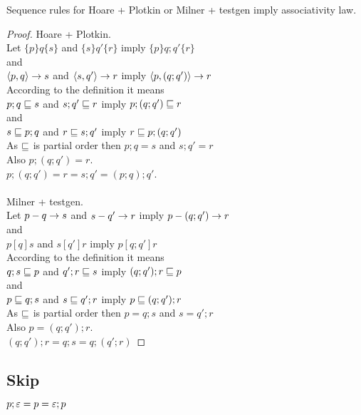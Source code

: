 \documentclass{article}
\begin{document}
\begin{theorem}
Sequence rules for Hoare + Plotkin or Milner + testgen imply associativity law.
\end{theorem}

\begin{proof}
Hoare + Plotkin.\\
Let $\{p\}q\{s\}$ and $\{s\}q'\{r\}$ imply $\{p\}q;q'\{r\}$\\
and\\
$\left< p, q \right> \rightarrow s$ and $\left< s, q' \right> \rightarrow r$ imply $\left< p, (q;q') \right> \rightarrow r$\\
According to the definition it means\\
$p; q \sqsubseteq s$ and $s; q' \sqsubseteq r$ imply $p; (q; q') \sqsubseteq r$\\
and\\
$s \sqsubseteq p; q$ and $r \sqsubseteq s; q'$ imply $r \sqsubseteq p; (q; q')$\\
As $\sqsubseteq$ is partial order then $p; q = s$ and $s; q' = r$\\
Also $p; (q; q') = r$.\\
$p; (q; q') = r = s; q' = (p; q); q'$.\\
\\
Milner + testgen.\\
Let $p-q\rightarrow s$ and $s-q'\rightarrow r$ imply $p-(q;q')\rightarrow r$\\
and\\
$p [q] s$ and $s [q'] r$ imply $p [q; q'] r$\\
According to the definition it means\\
$q; s \sqsubseteq p$ and $q'; r \sqsubseteq s$ imply $(q; q'); r \sqsubseteq p$\\
and\\
$p \sqsubseteq q; s$ and $s \sqsubseteq q'; r$ imply $p \sqsubseteq (q; q'); r$\\
As $\sqsubseteq$ is partial order then $p = q; s$ and $s = q'; r$\\
Also $p = (q; q'); r$.\\
$(q; q'); r = q; s = q; (q'; r)$
\end{proof}

\subsection*{Skip}

\begin{law}[Skip]
$p; \varepsilon = p = \varepsilon; p$
\end{law}
\end{document}
